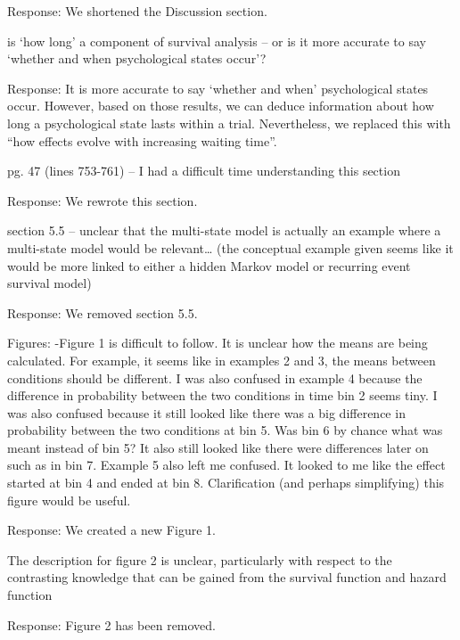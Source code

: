 \documentclass[
]{article}
\renewenvironment{quote}{\begin{leftbar}}{\end{leftbar}}
\begin{document}
Response: We shortened the Discussion section.

\begin{quote}
is `how long' a component of survival analysis -- or is it more accurate
to say `whether and when psychological states occur'?
\end{quote}

Response: It is more accurate to say `whether and when' psychological
states occur. However, based on those results, we can deduce information
about how long a psychological state lasts within a trial. Nevertheless,
we replaced this with ``how effects evolve with increasing waiting
time''.

\begin{quote}
pg. 47 (lines 753-761) -- I had a difficult time understanding this
section
\end{quote}

Response: We rewrote this section.

\begin{quote}
section 5.5 -- unclear that the multi-state model is actually an example
where a multi-state model would be relevant\ldots{} (the conceptual
example given seems like it would be more linked to either a hidden
Markov model or recurring event survival model)
\end{quote}

Response: We removed section 5.5.

\begin{quote}
Figures: -Figure 1 is difficult to follow. It is unclear how the means
are being calculated. For example, it seems like in examples 2 and 3,
the means between conditions should be different. I was also confused in
example 4 because the difference in probability between the two
conditions in time bin 2 seems tiny. I was also confused because it
still looked like there was a big difference in probability between the
two conditions at bin 5. Was bin 6 by chance what was meant instead of
bin 5? It also still looked like there were differences later on such as
in bin 7. Example 5 also left me confused. It looked to me like the
effect started at bin 4 and ended at bin 8. Clarification (and perhaps
simplifying) this figure would be useful.
\end{quote}

Response: We created a new Figure 1.

\begin{quote}
The description for figure 2 is unclear, particularly with respect to
the contrasting knowledge that can be gained from the survival function
and hazard function
\end{quote}

Response: Figure 2 has been removed.
\end{document}
